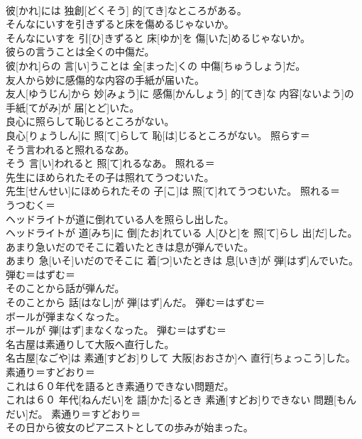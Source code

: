 \documentclass[8pt]{extreport}
\begin{document}
\begin{CJK}{UTF8}{min}
\\	彼[かれ]には 独創[どくそう] 的[てき]なところがある。	
\\	そんなにいすを引きずると床を傷めるじゃないか。	
\\	そんなにいすを 引[ひ]きずると 床[ゆか]を 傷[いた]めるじゃないか。	
\\	彼らの言うことは全くの中傷だ。	
\\	彼[かれ]らの 言[い]うことは 全[まった]くの 中傷[ちゅうしょう]だ。	
\\	友人から妙に感傷的な内容の手紙が届いた。	
\\	友人[ゆうじん]から 妙[みょう]に 感傷[かんしょう] 的[てき]な 内容[ないよう]の 手紙[てがみ]が 届[とど]いた。	
\\	良心に照らして恥じるところがない。	
\\	良心[りょうしん]に 照[て]らして 恥[は]じるところがない。	照らす＝ 
\\	そう言われると照れるなあ。	
\\	そう 言[い]われると 照[て]れるなあ。	照れる＝ 
\\	先生にほめられたその子は照れてうつむいた。	
\\	先生[せんせい]にほめられたその 子[こ]は 照[て]れてうつむいた。	照れる＝ 
\\	うつむく＝ 
\\	ヘッドライトが道に倒れている人を照らし出した。	
\\	ヘッドライトが 道[みち]に 倒[たお]れている 人[ひと]を 照[て]らし 出[だ]した。	
\\	あまり急いだのでそこに着いたときは息が弾んでいた。	
\\	あまり 急[いそ]いだのでそこに 着[つ]いたときは 息[いき]が 弾[はず]んでいた。	弾む＝はずむ＝ 
\\	そのことから話が弾んだ。	
\\	そのことから 話[はなし]が 弾[はず]んだ。	弾む＝はずむ＝ 
\\	ボールが弾まなくなった。	
\\	ボールが 弾[はず]まなくなった。	弾む＝はずむ＝ 
\\	名古屋は素通りして大阪へ直行した。	
\\	名古屋[なごや]は 素通[すどお]りして 大阪[おおさか]へ 直行[ちょっこう]した。	素通り＝すどおり＝ 
\\	これは６０年代を語るとき素通りできない問題だ。	
\\	これは６０ 年代[ねんだい]を 語[かた]るとき 素通[すどお]りできない 問題[もんだい]だ。	素通り＝すどおり＝ 
\\	その日から彼女のピアニストとしての歩みが始まった。	

\end{CJK}
\end{document}

